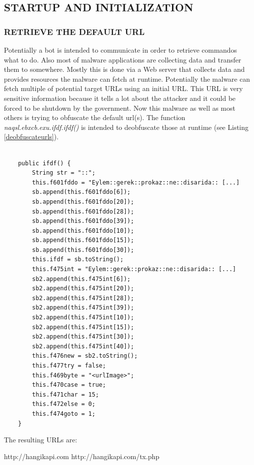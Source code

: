 \documentclass[10pt,titlepage]{article}
\begin{document}
\subsection{STARTUP AND INITIALIZATION}
\subsubsection{RETRIEVE THE DEFAULT URL}
Potentially a bot is intended to communicate in order to retrieve commandos what to do. Also most of malware applications are collecting data and transfer them to somewhere. Mostly this is done via a Web server that collects data and provides resources the malware can fetch at runtime. Potentially the malware can fetch multiple of potential target URLs using an initial URL. This URL is very sensitive information because it tells a lot about the attacker and it could be forced to be shutdown by the government. Now this malware as well as most others is trying to obfuscate the default url(s). The function \textit{naqsl.ebxcb.exu.ifdf.ifdf()} is intended to deobfuscate those at runtime (see Listing \ref{deobfuscateurls}).

\begin{lstlisting}[label=deobfuscateurls,caption=The function \textit{naqsl.ebxcb.exu.ifdf.ifdf()} deobfuscates the default URLs.,frame=tb]

    public ifdf() {
        String str = "::";
        this.f601fddo = "Eylem::gerek::prokaz::ne::disarida:: [...]
        sb.append(this.f601fddo[6]);
        sb.append(this.f601fddo[20]);
        sb.append(this.f601fddo[28]);
        sb.append(this.f601fddo[39]);
        sb.append(this.f601fddo[10]);
        sb.append(this.f601fddo[15]);
        sb.append(this.f601fddo[30]);
        this.ifdf = sb.toString();
        this.f475int = "Eylem::gerek::prokaz::ne::disarida:: [...]
        sb2.append(this.f475int[6]);
        sb2.append(this.f475int[20]);
        sb2.append(this.f475int[28]);
        sb2.append(this.f475int[39]);
        sb2.append(this.f475int[10]);
        sb2.append(this.f475int[15]);
        sb2.append(this.f475int[30]);
        sb2.append(this.f475int[40]);
        this.f476new = sb2.toString();
        this.f477try = false;
        this.f469byte = "<urlImage>";
        this.f470case = true;
        this.f471char = 15;
        this.f472else = 0;
        this.f474goto = 1;
    }
\end{lstlisting}

The resulting URLs are:

\begin{spverbatim}
http://hangikapi.com
http://hangikapi.com/tx.php
\end{spverbatim}
\end{document}
